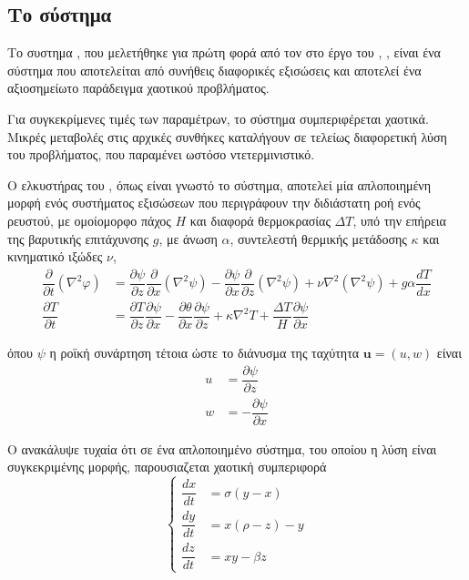 \subsection{Το σύστημα }
Tο συστημα , που μελετήθηκε για πρώτη φορά από τον  στο έργο του \textit{}, , είναι ένα σύστημα που αποτελείται από συνήθεις διαφορικές εξισώσεις και αποτελεί ένα αξιοσημείωτο παράδειγμα χαοτικού προβλήματος.

Για συγκεκρίμενες τιμές των παραμέτρων, το σύστημα συμπεριφέρεται χαοτικά. Μικρές μεταβολές στις αρχικές συνθήκες καταλήγουν σε τελείως διαφορετική λύση του προβλήματος, που παραμένει ωστόσο ντετερμινιστικό.

Ο ελκυστήρας του , όπως είναι γνωστό το σύστημα, αποτελεί μία απλοποιημένη μορφή ενός συστήματος εξισώσεων που περιγράφουν την διδιάστατη ροή ενός ρευστού, με ομοίομορφο πάχος $H$ και διαφορά θερμοκρασίας $ΔΤ$, υπό την επήρεια της βαρυτικής επιτάχυνσης $g$, με άνωση $α$, συντελεστή θερμικής μετάδοσης $κ$ και κινηματικό ιξώδες $ν$, 
\begin{align}
    \dfrac{\partial}{\partial{t}}\left(\nabla^{2} φ\right) &= \dfrac{\partial ψ}{\partial z} \dfrac{\partial}{\partial x}\left(\nabla^{2} ψ\right) - \dfrac{\partial ψ}{\partial x} \dfrac{\partial}{\partial z}\left(\nabla^{2} ψ\right) + ν\nabla^{2}\left(\nabla^{2}ψ\right) + gα\dfrac{dT}{dx} \\
    \dfrac{\partial T}{\partial t} &= \dfrac{\partial{T}}{\partial{z}}\dfrac{\partial{ψ}}{\partial{x}} - \dfrac{\partial{θ}}{\partial{x}}\dfrac{\partial{ψ}}{\partial{z}} + κ\nabla^{2}T + \dfrac{ΔT}{H}\dfrac{\partial{ψ}}{\partial{x}}
\end{align}

όπου $ψ$ η ροϊκή συνάρτηση τέτοια ώστε το διάνυσμα της ταχύτητα $\textbf{u}=\left(u, w\right)$ είναι
\begin{align}
    u &= \dfrac{\partial{ψ}}{\partial{z}} \\
    w &= -\dfrac{\partial{ψ}}{\partial{x}}
\end{align}

Ο  ανακάλυψε τυχαία ότι σε ένα απλοποιημένο σύστημα, του οποίου η λύση είναι συγκεκριμένης μορφής, παρουσιαζεται χαοτική συμπεριφορά
\begin{equation}
    \begin{cases}
        \dfrac{dx}{dt} &= σ\left(y - x\right) \\
        \dfrac{dy}{dt} &= x\left(ρ - z\right) - y \\
        \dfrac{dz}{dt} &= xy - βz 
    \end{cases}
\end{equation}

